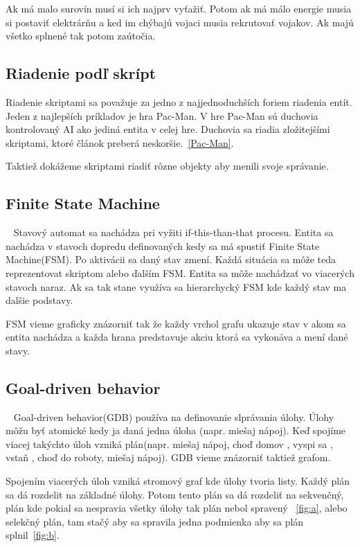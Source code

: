 \documentclass[10pt,oneside,slovak,a4paper]{article}
\begin{document}
Ak má malo surovín musí si ich najprv vyťažiť. Potom ak má málo energie musia si postaviť elektrárňu a ked im chýbajú vojaci musia rekrutovať vojakov. Ak majú všetko splnené tak potom zaútočia.

\vspace{1cm}


\newpage

\subsection{Riadenie podľ skrípt} \label{skript}

Riadenie skriptami sa považuje za jedno z najjednoduchších foriem riadenia entít. Jeden z najlepších príkladov je hra Pac-Man. V hre Pac-Man sú duchovia kontrolovaný AI ako jediná entita v celej hre. Duchovia sa riadia zložitejšími skriptami, ktoré článok preberá neskoršie.~\ref{Pac-Man}.

Taktiež dokážeme skriptami riadiť rôzne objekty aby menili svoje správanie. 


\subsection{Finite State Machine} \label{FSM}
~\cite{1.zdroj}
Stavový automat sa nachádza pri vyžiti if-this-than-that procesu. Entita sa nachádza v stavoch dopredu definovaných kedy sa má spustiť Finite State Machine(FSM). Po aktivácii sa daný stav zmení. Každá situácia sa môže teda reprezentovat skriptom alebo ďalším FSM. Entita sa môže nachádzať vo  viacerých stavoch naraz. Ak sa tak stane využíva sa hierarchycký FSM kde každý stav ma dalšie podstavy.

FSM vieme graficky znázorniť tak že každy vrchol grafu ukazuje stav v akom sa entita nachádza a každa hrana predstavuje akciu ktorá sa vykonáva a mení dané stavy.
\subsection{Goal-driven behavior} \label{GDB}
~\cite{1.zdroj}
Goal-driven behavior(GDB) používa na definovanie slprávania úlohy. Úlohy môžu byť atomické kedy ja daná jedna úloha (napr.  miešaj nápoj). Keď spojíme viacej takýchto úloh vzniká plán(napr. miešaj nápoj, choď domov , vyspi sa , vstaň , choď do roboty, miešaj nápoj). GDB vieme znázorniť taktiež grafom.

Spojením viacerých úloh vzniká stromový graf kde úlohy tvoria listy. Každý plán sa dá rozdelit na základné úlohy. Potom tento plán sa dá rozdeliť na sekvenčný, plán kde pokial sa nespravia všetky úlohy tak plán nebol spravený ~\ref{fig:a}, alebo selekčný plán, tam stačý aby sa spravila jedna podmienka aby sa plán splnil~\ref{fig:b}. 
\end{document}
